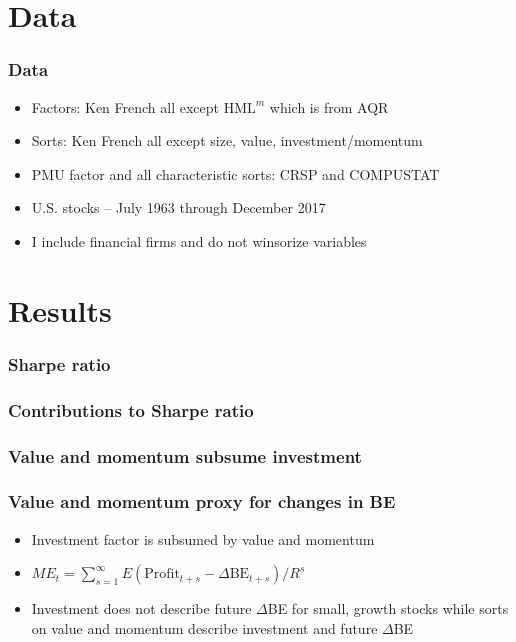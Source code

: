 \documentclass{beamer}
\begin{document}
\section{Data}

\begin{frame}
  \frametitle{Data}
  \begin{itemize}
    \item Factors: Ken French all except $\text{HML}^m$ which is from AQR
    \item Sorts: Ken French all except size, value, investment/momentum
    \item PMU factor and all characteristic sorts: CRSP and COMPUSTAT
    \item U.S. stocks -- July 1963 through December 2017
    \item I include financial firms and do not winsorize variables
  \end{itemize}
\end{frame}

\section{Results}

\begin{frame}
\frametitle{Sharpe ratio}
\resizebox{\linewidth}{!}{}
\end{frame}

\begin{frame}
\frametitle{Contributions to Sharpe ratio}
\begin{center}
\resizebox*{!}{\dimexpr\textheight-1.3cm\relax}{
    
    }
\end{center}
\end{frame}

\begin{frame}
\frametitle{Value and momentum subsume investment}
\begin{center}
\resizebox*{!}{\dimexpr\textheight-1.3cm\relax}{
    
    }
\end{center}
\end{frame}

\begin{frame}
\frametitle{Value and momentum proxy for changes in BE}
\begin{itemize}
    \item Investment factor is subsumed by value and momentum
    \item $ME_t =
    \sum_{s=1}^\infty E\left( \text{Profit}_{t+s}-
    \Delta\text{BE}_{t+s}\right) /R^s$
    \item Investment does not describe future $\Delta$BE for small, growth
    stocks while sorts on value and momentum describe investment and future
    $\Delta$BE
\end{itemize}
\end{frame}
\end{document}
